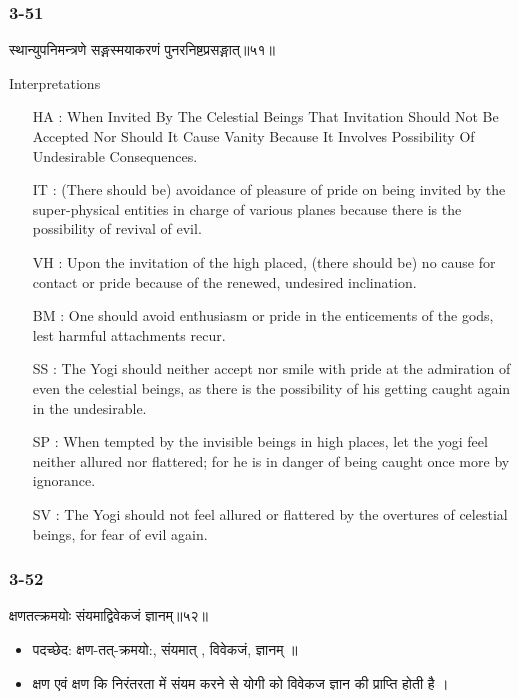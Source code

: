 \begin{frame}[fragile]\frametitle{3-51}
\begin{sanskrit}
स्थान्युपनिमन्त्रणे सङ्गस्मयाकरणं पुनरनिष्टप्रसङ्गात्॥५१॥
\end{sanskrit}

Interpretations
\begin{itemize}	
\item [HA]: When Invited By The Celestial Beings That Invitation Should Not Be Accepted Nor Should It Cause Vanity Because It Involves Possibility Of Undesirable Consequences.
\item [IT]: (There should be) avoidance of pleasure of pride on being invited by the super-physical entities in charge of various planes because there is the possibility of revival of evil.
\item [VH]: Upon the invitation of the high placed, (there should be) no cause for contact or pride because of the renewed, undesired inclination.
\item [BM]: One should avoid enthusiasm or pride in the enticements of the gods, lest harmful attachments recur.
\item [SS]: The Yogi should neither accept nor smile with pride at the admiration of even the celestial beings, as there is the possibility of his getting caught again in the undesirable.
\item [SP]: When tempted by the invisible beings in high places, let the yogi feel neither allured nor flattered; for he is in danger of being caught once more by ignorance.
\item [SV]: The Yogi should not feel allured or flattered by the overtures of celestial beings, for fear of evil again. 
\end{itemize}
\end{frame}

\begin{frame}[fragile]\frametitle{3-52}
\begin{sanskrit}
क्षणतत्क्रमयोः संयमाद्विवेकजं ज्ञानम्॥५२॥
\end{sanskrit}

\begin{itemize}
\item पदच्छेद:  क्षण-तत्-क्रमयो:, संयमात् , विवेकजं, ज्ञानम् ‌॥
\item क्षण एवं क्षण कि निरंतरता में संयम करने से योगी को विवेकज ज्ञान की प्राप्ति होती है ।
\end{itemize}
\end{frame}


